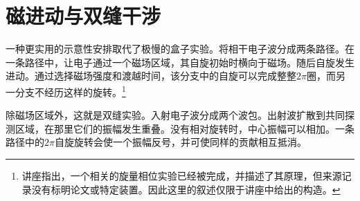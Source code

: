 \section{磁进动与双缝干涉}

一种更实用的示意性安排取代了极慢的盒子实验。将相干电子波分成两条路径。在一条路径中，让电子通过一个磁场区域，其自旋初始时横向于磁场。随后自旋发生进动。通过选择磁场强度和渡越时间，该分支中的自旋可以完成整整\(2\pi\)圈，而另一分支不经历这样的旋转。\footnote{讲座指出，一个相关的旋量相位实验已经被完成，并描述了其原理，但来源记录没有标明论文或特定装置。因此这里的叙述仅限于讲座中给出的构造。}

\begin{classroomqa}
\end{classroomqa}

\begin{classroomqa}
\end{classroomqa}

除磁场区域外，这就是双缝实验。入射电子波分成两个波包。出射波扩散到共同探测区域，在那里它们的振幅发生重叠。没有相对旋转时，中心振幅可以相加。一条路径中的\(2\pi\)自旋旋转会使一个振幅反号，并可使同样的贡献相互抵消。

\begin{classroomqa}
\end{classroomqa}

\begin{classroomqa}
\end{classroomqa}

\begin{classroomqa}
\end{classroomqa}

